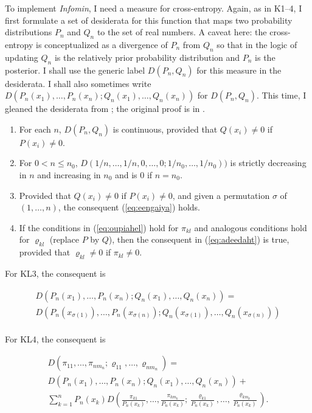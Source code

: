 \documentclass[phd,12pt,oneside]{ubcthesis}
\begin{document}
To implement \emph{Infomin}, I need a measure for cross-entropy.
Again, as in K1--4, I first formulate a set of desiderata for this
function that maps two probability distributions $P_{n}$ and $Q_{n}$
to the set of real numbers. A caveat here: the cross-entropy is
conceptualized as a divergence of $P_{n}$ from $Q_{n}$ so that in the
logic of updating $Q_{n}$ is the relatively prior probability
distribution and $P_{n}$ is the posterior. I shall use the generic
label $D(P_{n},Q_{n})$ for this measure in the desiderata. I shall
also sometimes write
$D(P_{n}(x_{1}),\ldots,P_{n}(x_{n});Q_{n}(x_{1}),\ldots,Q_{n}(x_{n}))$
for $D(P_{n},Q_{n})$. This time, I gleaned the desiderata from
; the original proof is in
.

\begin{enumerate}[(KL1)]
\item For each $n$, $D(P_{n},Q_{n})$ is continuous, provided that
  $Q(x_{i})\neq{}0$ if $P(x_{i})\neq{}0$.
\item For $0<n\leq{}n_{0}$,
  $D(1/n,\ldots,1/n,0,\ldots,0;1/n_{0},\ldots,1/n_{0}))$ is strictly
  decreasing in $n$ and increasing in $n_{0}$ and is $0$ if $n=n_{0}$.
\item Provided that $Q(x_{i})\neq{}0$ if $P(x_{i})\neq{}0$, and given
  a permutation $\sigma$ of $(1,\ldots,n)$, the consequent
  (\ref{eq:eengaiya}) holds.
\item If the conditions in (\ref{eq:oupiahel}) hold for $\pi_{kl}$ and
  analogous conditions hold for $\varrho_{kl}$ (replace $P$ by $Q$),
  then the consequent in (\ref{eq:adeedaht}) is true, provided that
  $\varrho_{kl}\neq{}0$ if $\pi_{kl}\neq{}0$.
\end{enumerate}

{\noindent}For KL3, the consequent is

\begin{equation}
  \label{eq:eengaiya}
  \begin{array}{l}
    \displaystyle
    D(P_{n}(x_{1}),\ldots,P_{n}(x_{n});Q_{n}(x_{1}),\ldots,Q_{n}(x_{n}))= \\
    D(P_{n}(x_{\sigma(1)}),\ldots,P_{n}(x_{\sigma(n)});Q_{n}(x_{\sigma(1)}),\ldots,Q_{n}(x_{\sigma(n)})) \\
  \end{array}
\end{equation}

{\noindent}For KL4, the consequent is

\begin{equation}
  \label{eq:adeedaht}
  \begin{array}{l}
    \displaystyle D(\pi_{11},\ldots,\pi_{nm_{n}};\varrho_{11},\ldots,\varrho_{nm_{n}})= \\
    \displaystyle D(P_{n}(x_{1}),\ldots,P_{n}(x_{n});Q_{n}(x_{1}),\ldots,Q_{n}(x_{n}))+ \\
    \displaystyle \sum_{k=1}^{n}P_{n}(x_{k})D\left(\frac{\pi_{k1}}{P_{n}(x_{k})},\ldots,\frac{\pi_{km_{k}}}{P_{n}(x_{k})};\frac{\varrho_{k1}}{P_{n}(x_{k})},\ldots,\frac{\varrho_{km_{k}}}{P_{n}(x_{k})}\right). \\
  \end{array}
\end{equation}
\end{document}
